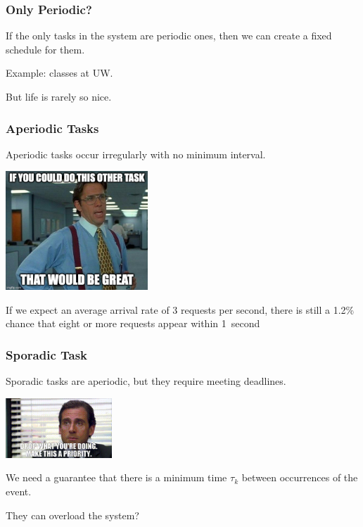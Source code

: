 \begin{frame}
\frametitle{Only Periodic?}

If the only tasks in the system are periodic ones, then we can create a fixed schedule for them.

Example: classes at UW.

But life is rarely so nice.

\end{frame}

\begin{frame}
\frametitle{Aperiodic Tasks}

Aperiodic tasks occur irregularly with no minimum interval.

\begin{center}
	\includegraphics[width=0.4\textwidth]{images/aperiodic.jpg}
\end{center}

If we expect an average arrival rate of 3 requests per second, there is still a 1.2\% chance that eight or more requests appear within 1~second

\end{frame}

\begin{frame}
\frametitle{Sporadic Task}

Sporadic tasks are aperiodic, but they require meeting deadlines.

\begin{center}
	\includegraphics[width=0.3\textwidth]{images/sporadic.jpg}
\end{center}

We need a guarantee that there is a minimum time $\tau_{k}$ between occurrences of the event.

They can overload the system?

\end{frame}

